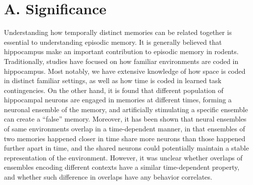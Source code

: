 \documentclass[master.tex]{subfiles}
\begin{document}
\section*{A. Significance}

Understanding how temporally distinct memories can be related together is
essential to understanding episodic memory. It is generally believed that
hippocampus make an important contribution to episodic memory in rodents.
Traditionally, studies have focused on how familiar environments are coded in
hippocampus. Most notably, we have extensive knowledge of how space is coded in
distinct familiar settings, as well as how time is coded in learned task
contingencies. On the other hand, it is found that different population of
hippocampal neurons are engaged in memories at different times, forming a
neuronal ensemble of the memory, and artificially stimulating a specific
ensemble can create a ``false'' memory. Moreover, it has been shown that neural
ensembles of same environments overlap in a time-dependent manner, in that
ensembles of two memories happened closer in time share more neurons than those
happened further apart in time, and the shared neurons could potentially
maintain a stable representation of the environment. However, it was unclear
whether overlaps of ensembles encoding different contexts have a similar
time-dependent property, and whether such difference in overlaps have any
behavior correlates.
\end{document}
